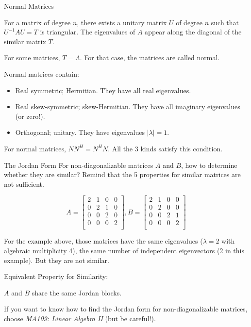 \documentclass{beamer}
\begin{document}
\begin{frame}{Normal Matrices}
\begin{theorem}
    For a matrix of degree $n$, there exists a unitary matrix $U$ of degree $n$ such that $U^{-1}AU=T$ is triangular. The eigenvalues of $A$ appear along the diagonal of the similar matrix $T$.
\end{theorem}

For some matrices, $T=\varLambda$. For that case, the matrices are called normal.

\vspace{3pt}
Normal matrices contain:
\begin{itemize}
    \item Real symmetric; Hermitian. They have all real eigenvalues.
    \item Real skew-symmetric; skew-Hermitian. They have all imaginary eigenvalues (or zero!).
    \item Orthogonal; unitary. They have eigenvalues $|\lambda|=1$.
\end{itemize}

For normal matrices, $NN^H=N^HN$. All the 3 kinds satisfy this condition.

\end{frame}


\begin{frame}{The Jordan Form}
For non-diagonalizable matrices $A$ and $B$, how to determine whether they are similar? Remind that the 5 properties for similar matrices are not sufficient.

\begin{equation*}
    A=\left[ \begin{matrix}
        2&		1&		0&		0\\
        0&		2&		1&		0\\
        0&		0&		2&		0\\
        0&		0&		0&		2\\
    \end{matrix} \right] , B=\left[ \begin{matrix}
        2&		1&		0&		0\\
        0&		2&		0&		0\\
        0&		0&		2&		1\\
        0&		0&		0&		2\\
    \end{matrix} \right]
\end{equation*}

For the example above, those matrices have the same eigenvalues ($\lambda =2$ with algebraic multiplicity 4), the same number of independent eigenvectors (2 in this example). But they are not similar.

\vspace{3pt}
Equivalent Property for Similarity:
\begin{center}
    $A$ and $B$ share the same Jordan blocks.
\end{center}

If you want to know how to find the Jordan form for non-diagonalizable matrices, choose \emph{MA109: Linear Algebra II} (but be careful!).
\end{frame}
\end{document}
